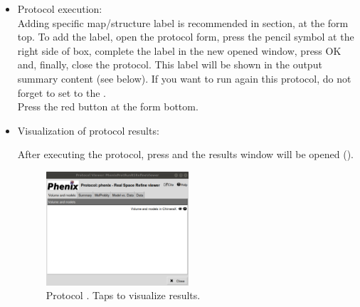 \begin{itemize}
 \item Protocol execution:\\
 Adding specific map/structure label is recommended in  section, at the form top. To add the label, open the protocol form, press the pencil symbol at the right side of  box, complete the label in the new opened window, press OK and, finally, close the protocol. This label will be shown in the output summary content (see below). If you want to run again this protocol, do not forget to set to  the .\\
  Press the  red button at the form bottom.
  
 \item Visualization of protocol results:
 
 After executing the protocol, press  and the results window will be opened (). 
  
    \begin{figure}[H]
     \centering 
     \captionsetup{width=.9\linewidth} 
     \includegraphics[width=0.50\textwidth]{Images_appendix/Fig149.pdf}
     \caption{Protocol . Taps to visualize  results.}
     \label{fig:app_protocol_real_space_refine_2}
    \end{figure}
    

\end{itemize}
